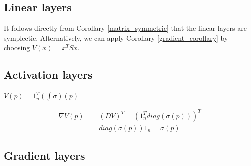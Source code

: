 \documentclass[twoside,a4paper]{article}
\begin{document}

\subsection{Linear layers}

It follows directly from Corollary \ref{matrix_symmetric} that the linear layers are
symplectic. Alternatively, we can apply Corollary \ref{gradient_corollary} by
choosing $V(x) = x^TSx$.


\subsection{Activation layers}

$V(p) = 1_n^T(\int \sigma)(p)$

\begin{align*}
	\nabla V(p) &= (DV)^T = (1_n^Tdiag(\sigma(p)))^T \\
	&= diag(\sigma(p)) 1_n = \sigma(p)
\end{align*}


\subsection{Gradient layers}
\end{document}
